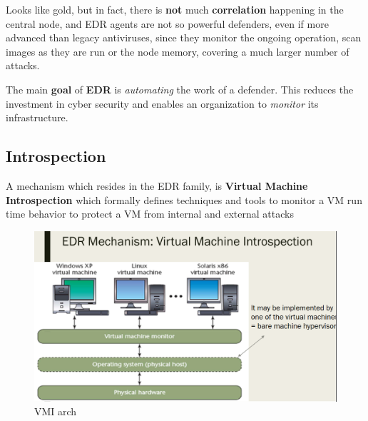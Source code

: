 Looks like gold, but in fact, there is \textbf{not} much \textbf{correlation} happening in the central node,
and EDR agents are not so powerful defenders,
even if more advanced than legacy antiviruses,
since they monitor the ongoing operation, scan images as they are
run or the node memory, covering a much larger number of
attacks.

The main \textbf{goal} of \textbf{EDR} is \textit{automating} the work of a defender.
This reduces the investment in cyber security and enables an
organization to \textit{monitor} its infrastructure.

\subsection{Introspection}
A mechanism which resides in the EDR family, is \textbf{Virtual Machine Introspection} which formally defines techniques and tools to monitor a VM run time behavior to protect a VM from internal and external attacks


\begin{figure}[htbp]
   \centering
   \includegraphics{images/VMI_arch.png}
   \caption{VMI arch}
   \label{fig:VMI_arch}
\end{figure}


